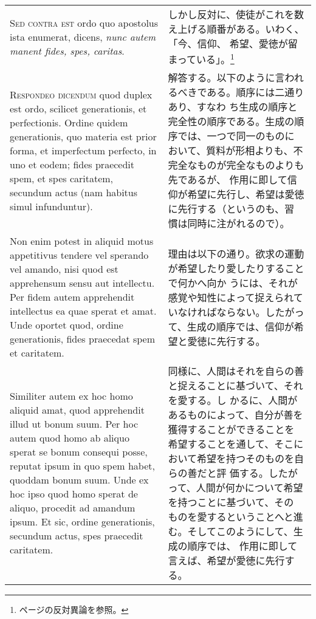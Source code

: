 \documentclass[10pt]{jsarticle}
\begin{document}
\begin{longtable}{p{21em}p{21em}}
 \\



{\scshape Sed contra est} ordo quo apostolus ista enumerat, dicens,
{\itshape nunc autem manent fides, spes, caritas}.

&

 しかし反対に、使徒がこれを数え上げる順番がある。いわく、「今、信仰、
 希望、愛徳が留まっている」。\footnote{\pageref{fides_spes_caritas}ページの反対異論を参照。}


 \\


 {\scshape Respondeo dicendum} quod duplex est ordo, scilicet
 generationis, et perfectionis. Ordine quidem generationis, quo
 materia est prior forma, et imperfectum perfecto, in uno et eodem;
 fides praecedit spem, et spes caritatem, secundum actus (nam habitus
 simul infunduntur).

&

 解答する。以下のように言われるべきである。順序には二通りあり、すなわ
 ち生成の順序と完全性の順序である。生成の順序では、一つで同一のものに
 おいて、質料が形相よりも、不完全なものが完全なものよりも先であるが、
 作用に即して信仰が希望に先行し、希望は愛徳に先行する（というのも、習
 慣は同時に注がれるので）。


 \\



 Non enim potest in aliquid motus appetitivus tendere vel sperando vel
 amando, nisi quod est apprehensum sensu aut intellectu. Per fidem
 autem apprehendit intellectus ea quae sperat et amat. Unde oportet
 quod, ordine generationis, fides praecedat spem et caritatem.

&

 理由は以下の通り。欲求の運動が希望したり愛したりすることで何かへ向か
 うには、それが感覚や知性によって捉えられていなければならない。したがっ
 て、生成の順序では、信仰が希望と愛徳に先行する。


 \\


 Similiter autem ex hoc homo aliquid amat, quod apprehendit illud ut
 bonum suum. Per hoc autem quod homo ab aliquo sperat se bonum
 consequi posse, reputat ipsum in quo spem habet, quoddam bonum
 suum. Unde ex hoc ipso quod homo sperat de aliquo, procedit ad
 amandum ipsum. Et sic, ordine generationis, secundum actus, spes
 praecedit caritatem.

&

 同様に、人間はそれを自らの善と捉えることに基づいて、それを愛する。し
 かるに、人間があるものによって、自分が善を獲得することができることを
 希望することを通して、そこにおいて希望を持つそのものを自らの善だと評
 価する。したがって、人間が何かについて希望を持つことに基づいて、その
 ものを愛するということへと進む。そしてこのようにして、生成の順序では、
 作用に即して言えば、希望が愛徳に先行する。



\end{longtable}
\end{document}
